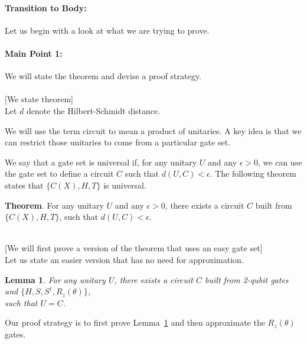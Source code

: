 \documentclass[11pt]{article}
\newtheorem{lemma}[theorem]{Lemma}
\begin{document}
\paragraph{Transition to Body:} 
Let us begin with a look at what we are trying to prove.

\paragraph{Main Point 1:}
We will state the theorem and devise a proof strategy. \\
\mbox{} \\ \hspace*{1cm}
   [We state theorem] \\ 
Let $d$ denote the Hilbert-Schmidt distance.

\bigskip

We will use the term circuit to mean a product of unitaries.
A key idea is that we can restrict those unitaries to come from
a particular gate set.  

We say that a gate set is universal if,
for any unitary $U$ and any $\epsilon > 0$, 
we can use the gate set to define a circuit $C$
such that $d(U,C) < \epsilon$.
The following theorem states that $\{C(X), H, T\}$ is universal.

\bigskip

\noindent
{\bf Theorem}.  For any unitary $U$ and any $\epsilon > 0$, 
there exists a circuit $C$ built from $\{C(X), H, T\}$,
such that $d(U,C) < \epsilon$.

\mbox{} \\ \hspace*{1cm}
   [We will first prove a version of the theorem that uses an easy gate set] \\
Let us state an easier version that has no need for approximation.

\begin{lemma} 
For any unitary $U$,
there exists a circuit $C$ built from 
2-qubit gates and
$\{H, S, S^\dagger, R_z(\theta)\}$, \\
such that $U = C$.
\label{lem:decomposition-to-an-easy-gate-set}
\end{lemma}

Our proof strategy is to first prove 
Lemma~\ref{lem:decomposition-to-an-easy-gate-set} 
and then approximate the $R_z(\theta)$ gates.
\end{document}
